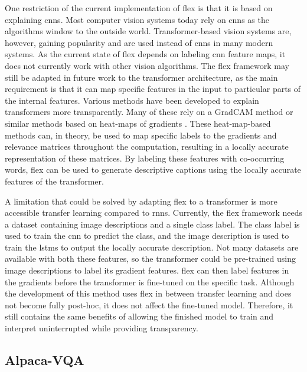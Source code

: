     One restriction of the current implementation of \gls{flex} is that it is based on explaining \glspl{cnn}. Most computer vision systems today rely on \glspl{cnn} as the algorithms window to the outside world. 
    Transformer-based vision systems are, however, gaining popularity and are used instead of \glspl{cnn} in many modern systems. As the current state of \gls{flex} depends on labeling \gls{cnn} feature maps, it does not currently work with other vision algorithms. The \gls{flex} framework may still be adapted in future work to the transformer architecture, as the main requirement is that it can map specific features in the input to particular parts of the internal features. Various methods have been developed to explain transformers more transparently. Many of these rely on a GradCAM method or similar methods based on heat-maps of gradients \cite{barkanGradSAMExplainingTransformers2021, cheferTransformerInterpretabilityAttention2021}.
    These heat-map-based methods can, in theory, be used to map specific labels to the gradients and relevance matrices throughout the computation, resulting in a locally accurate representation of these matrices. By labeling these features with co-occurring words, \gls{flex} can be used to generate descriptive captions using the locally accurate features of the transformer.
    
    A limitation that could be solved by adapting \gls{flex} to a transformer is more accessible transfer learning compared to \glspl{rnn}. Currently, the \gls{flex} framework needs a dataset containing image descriptions and a single class label. The class label is used to train the \gls{cnn} to predict the class, and the image description is used to train the \glspl{lstm} to output the locally accurate description. Not many datasets are available with both these features, so the transformer could be pre-trained using image descriptions to label its gradient features. \gls{flex} can then label features in the gradients before the transformer is fine-tuned on the specific task. Although the development of this method uses \gls{flex} in between transfer learning and does not become fully post-hoc, it does not affect the fine-tuned model. Therefore, it still contains the same benefits of allowing the finished model to train and interpret uninterrupted while providing transparency.


\subsection{Alpaca-VQA}

